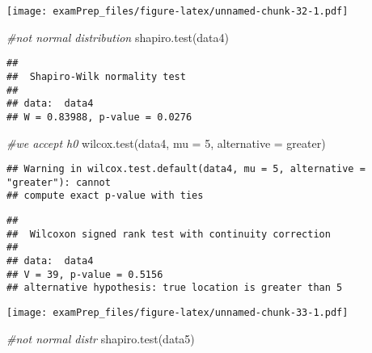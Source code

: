 \documentclass[
]{article}
\newenvironment{Shaded}{\begin{snugshade}}{\end{snugshade}}
\newcommand{\AttributeTok}[1]{\textcolor[rgb]{0.77,0.63,0.00}{#1}}
\newcommand{\CommentTok}[1]{\textcolor[rgb]{0.56,0.35,0.01}{\textit{#1}}}
\newcommand{\DecValTok}[1]{\textcolor[rgb]{0.00,0.00,0.81}{#1}}
\newcommand{\FunctionTok}[1]{\textcolor[rgb]{0.00,0.00,0.00}{#1}}
\newcommand{\NormalTok}[1]{#1}
\newcommand{\OtherTok}[1]{\textcolor[rgb]{0.56,0.35,0.01}{#1}}
\newcommand{\SpecialCharTok}[1]{\textcolor[rgb]{0.00,0.00,0.00}{#1}}
\newcommand{\StringTok}[1]{\textcolor[rgb]{0.31,0.60,0.02}{#1}}
\begin{document}
\texttt{[image: examPrep\_files/figure-latex/unnamed-chunk-32-1.pdf]}

\begin{Shaded}
\begin{Highlighting}[]
\CommentTok{\#not normal distribution}
\FunctionTok{shapiro.test}\NormalTok{(data4)}
\end{Highlighting}
\end{Shaded}

\begin{verbatim}
## 
##  Shapiro-Wilk normality test
## 
## data:  data4
## W = 0.83988, p-value = 0.0276
\end{verbatim}

\begin{Shaded}
\begin{Highlighting}[]
\CommentTok{\#we accept h0}
\FunctionTok{wilcox.test}\NormalTok{(data4, }\AttributeTok{mu =} \DecValTok{5}\NormalTok{, }\AttributeTok{alternative =} \StringTok{\textquotesingle{}greater\textquotesingle{}}\NormalTok{)}
\end{Highlighting}
\end{Shaded}

\begin{verbatim}
## Warning in wilcox.test.default(data4, mu = 5, alternative = "greater"): cannot
## compute exact p-value with ties
\end{verbatim}

\begin{verbatim}
## 
##  Wilcoxon signed rank test with continuity correction
## 
## data:  data4
## V = 39, p-value = 0.5156
## alternative hypothesis: true location is greater than 5
\end{verbatim}

\begin{Shaded}
\end{Shaded}

\texttt{[image: examPrep\_files/figure-latex/unnamed-chunk-33-1.pdf]}

\begin{Shaded}
\begin{Highlighting}[]
\CommentTok{\#not normal distr}
\FunctionTok{shapiro.test}\NormalTok{(data5)}
\end{Highlighting}
\end{Shaded}
\end{document}

